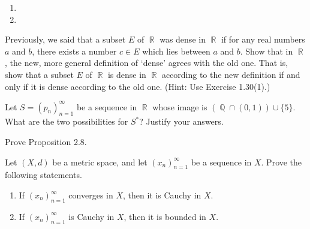 \documentclass[12pt,letterpaper,boxed]{hmcpset}
\DeclareMathOperator{\R}{\mathbb{R}}
\DeclareMathOperator{\Q}{\mathbb{Q}}
\begin{document}
\begin{solution}
\vspace{-2mm}
	\begin{enumerate}
		\itemsep0em
		\item 
		\item
	\end{enumerate}
\end{solution}

\begin{problem}[Exercise 1.31]
Previously, we said that a subset $E$ of $\R$ was dense in $\R$ if for any real numbers $a$
and $b$, there exists a number $c\in E$ which lies between $a$ and $b$. Show that in $\R$, the new, more general definition of ‘dense’ agrees with the old one. That is, show that a subset $E$ of $\R$ is dense in $\R$ according
to the new definition if and only if it is dense according to the old one. (Hint: Use Exercise 1.30(1).)
\end{problem}

\begin{solution}

\end{solution}


\begin{problem}[Exercise 2.7]
Let $S = (p_n)_{n=1}^{\infty}$ be a sequence in $\R$ whose image is $(\Q\cap (0,1))\cup \{5\}.$ What are the two possibilities for $S^{*}$? Justify your answers.
\end{problem}

\begin{solution}

\end{solution}

\begin{problem}[Exercise 2.9]
Prove Proposition 2.8.
\end{problem}

\begin{solution}

\end{solution}


\begin{problem}[Exercise 2.16]
Let $(X, d)$ be a metric space, and let $(x_n)_{n=1}^{\infty}$ be a sequence in $X$. Prove the following statements.
\vspace{-2mm}
	\begin{enumerate}
		\itemsep0em
		\item If $(x_n)_{n=1}^{\infty}$ converges in $X$, then it is Cauchy in $X$.
		\item If $(x_n)_{n=1}^{\infty}$ is Cauchy in $X$, then it is bounded in $X$.
	\end{enumerate}
\end{problem}
\end{document}

